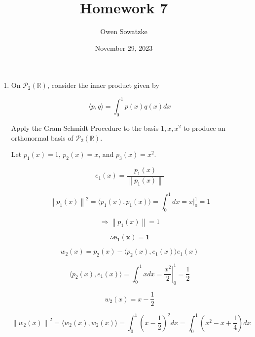 \documentclass[fleqn]{article}
\title{Homework 7}
\author{Owen Sowatzke}
\date{November 29, 2023}
\newcommand{\zerodisplayskip}{
	\setlength{\abovedisplayskip}{0pt}%
	\setlength{\belowdisplayskip}{0pt}%
	\setlength{\abovedisplayshortskip}{0pt}%
	\setlength{\belowdisplayshortskip}{0pt}%
	\setlength{\mathindent}{0pt}}
\newcommand{\norm}[1]{\left \lVert #1 \right \rVert}
\begin{document}
	\offinterlineskip
	\setlength{\lineskip}{12pt}
	\zerodisplayskip
	\maketitle
	
	\begin{enumerate}[nolistsep]
		\item On $\mathcal{P}_2(\mathbb{R})$, consider the inner product given by
		
		\begin{equation*}
			\langle p, q \rangle = \int_{0}^{1}{p(x)q(x)dx}
		\end{equation*}
		
		Apply the Gram-Schmidt Procedure to the basis $1, x, x^2$ to produce an orthonormal basis of $\mathcal{P}_2(\mathbb{R})$.
		
		Let $p_1(x) = 1$, $p_2(x) = x$, and $p_3(x) = x^2$.
		
		\begin{equation*}
			e_1(x) = \frac{p_1(x)}{\norm{p_1(x)}}
		\end{equation*}  
		
		\begin{equation*}
			\norm{p_1(x)}^2 = \langle p_1(x), p_1(x) \rangle = \int_{0}^{1}{dx} = \left.x\right\vert_{0}^{1} = 1
		\end{equation*}
		
		\begin{equation*}
			\Rightarrow \norm{p_1(x)} = 1			
		\end{equation*}
		
		\begin{equation*}
			\mathbf{\therefore e_1(x) = 1}
		\end{equation*}
		
		\begin{equation*}
			w_2(x) = p_2(x) - \langle p_2(x), e_1(x) \rangle e_1(x)
		\end{equation*}
		
		\begin{equation*}
			\langle p_2(x), e_1(x) \rangle = \int_{0}^{1}{x dx} = \left.\frac{x^2}{2}\right\vert_{0}^{1} = \frac{1}{2}
		\end{equation*}
		
		\begin{equation*}
			w_2(x) = x - \frac{1}{2}
		\end{equation*}
		
		\begin{equation*}
			\norm{w_2(x)}^2 = \langle w_2(x), w_2(x) \rangle = \int_{0}^{1}{\left(x - \frac{1}{2}\right)^{2}dx} = \int_{0}^{1}{\left(x^{2} - x + \frac{1}{4}\right)dx}
		\end{equation*}
		

\end{enumerate}
\end{document}
